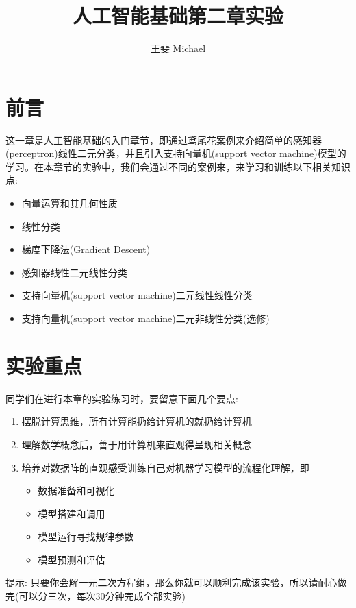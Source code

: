 \documentclass[11pt]{article}
\theoremstyle{definition}
\numberwithin{equation}{section}
\begin{document}


\title{人工智能基础第二章实验}
\author{王斐 Michael}
\date{}

\maketitle

\section{前言}

这一章是人工智能基础的入门章节，即通过鸢尾花案例来介绍简单的感知器(perceptron)线性二元分类，并且引入支持向量机(support vector machine)模型的学习。在本章节的实验中，我们会通过不同的案例来，来学习和训练以下相关知识点:
\begin{itemize}
	\item 向量运算和其几何性质
	\item 线性分类
	\item 梯度下降法(Gradient Descent)
	\item 感知器线性二元线性分类
	\item 支持向量机(support vector machine)二元线性线性分类
	\item 支持向量机(support vector machine)二元非线性分类(选修)
\end{itemize}

\section{实验重点}

同学们在进行本章的实验练习时，要留意下面几个要点:
\begin{enumerate}
	\item 摆脱计算思维，所有计算能扔给计算机的就扔给计算机
	\item 理解数学概念后，善于用计算机来直观得呈现相关概念
	\item 培养对数据阵的直观感受训练自己对机器学习模型的流程化理解，即 \begin{itemize}
		\item 数据准备和可视化
		\item 模型搭建和调用
		\item 模型运行寻找规律参数
		\item 模型预测和评估
	\end{itemize}
\end{enumerate}

提示: 只要你会解一元二次方程组，那么你就可以顺利完成该实验，所以请耐心做完(可以分三次，每次30分钟完成全部实验)
\end{document}

